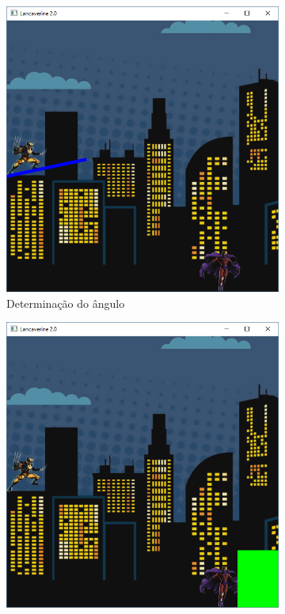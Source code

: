 \begin{enumerate}
   \begin{figure}[!htp]
    \centering
    \begin{subfigure}[b]{0.3\textwidth}
        \centerline{\includegraphics[width=.9\textwidth]{img/cap3_ex27}}
        \caption{Determinação do ângulo}
        \label{fig:cap03_ex27a}
    \end{subfigure}
    \hfill
    \begin{subfigure}[b]{0.3\textwidth}
        \centerline{\includegraphics[width=.9\textwidth]{img/cap3_ex27b}}

\end{subfigure}
\end{figure}
\end{enumerate}
